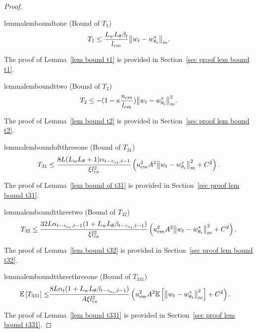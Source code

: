 \documentclass[twoside,11pt]{article}
\newcommand{\E}{\mathbb{E}}
\numberwithin{assucounter}{section}
\begin{document}
\begin{proof}
\begin{restatable}{lemma}{lemboundtone}
  \label{lem bound t1}
  (Bound of $T_1$)
  \begin{align}
      T_1 
      \leq \frac{L_w L_\theta \beta_t}{l_{cm}} \norm{w_t - w^*_{\theta_t}}_m.
  \end{align}
\end{restatable}
\noindent
The proof of Lemma~\ref{lem bound t1} is provided in Section~\ref{sec proof lem bound t1}.

\begin{restatable}{lemma}{lemboundttwo}
  \label{lem bound t2}
(Bound of $T_2$)
\begin{align}
  T_2 \leq -(1 - \kappa\frac{u_{cm}}{l_{cm}}) \norm{w_t - w^*_{\theta_t}}_m^2.
\end{align}
\end{restatable}
\noindent
The proof of Lemma~\ref{lem bound t2} is provided in Section~\ref{sec proof lem bound t2}.

\begin{restatable}{lemma}{lemboundoftthreeone}
  \label{lem bound of t31}
  (Bound of $T_{31}$)
  \begin{align}
      T_{31} \leq \frac{8L(L_wL_\theta + 1)  \alpha_{t-\tau_{\alpha_t}, t-1}}{\xi l_{cs}^2} \left(u_{cm}^2A^2\norm{w_t - w^*_{\theta_t}}_m^2 + C^2\right).
  \end{align}
\end{restatable}
\noindent
The proof of Lemma~\ref{lem bound of t31} is provided in Section~\ref{sec proof lem bound t31}.

\begin{restatable}{lemma}{lemboundtthreetwo}
  \label{lem bound t32}
  (Bound of $T_{32}$)
  \begin{align}
      T_{32} \leq \frac{32 L  \alpha_{t-\tau_{\alpha_t}, t-1}(1 + L_wL_\theta \beta_{t-\tau_{\alpha_t}, t-1})}{\xi l_{cs}^2} \left( u_{cm}^2A^2\norm{w_t - w^*_{\theta_t}}_m^2 + C^2 \right).
  \end{align}
\end{restatable}
\noindent
The proof of Lemma~\ref{lem bound t32} is provided in Section~\ref{sec proof lem bound t32}.

\begin{restatable}{lemma}{lemboundtthreethreeone}
  \label{lem bound t331}
  (Bound of $T_{331}$)
\begin{align}
  \E\left[T_{331}\right]
  \leq & \frac{8L \alpha_t(1 + L_wL_\theta \beta_{t-\tau_{\alpha_t}, t-1})}{A\xi l_{cs}^2}\left(u_{cm}^2 A^2 \E \left[\norm{w_t - w^*_{\theta_t}}_m^2\right] + C^2\right).
\end{align}
\end{restatable}
\noindent
The proof of Lemma~\ref{lem bound t331} is provided in Section~\ref{sec proof lem bound t331}.


\end{proof}
\end{document}
